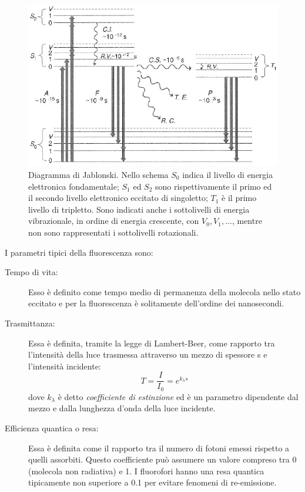 \begin{figure}
 \centering
 \includegraphics[scale=.45]{img/CAP1jablonski.JPG}
 \caption{\small{Diagramma di Jablonski. Nello schema $S_0$ indica il livello di energia elettronica fondamentale; $S_1$ ed $S_2$ sono rispettivamente il primo ed il secondo livello elettronico eccitato di singoletto; $T_1$ è il primo livello di tripletto. Sono indicati anche i sottolivelli di energia vibrazionale, in ordine di energia crescente, con $V_0, V_1, ...$, mentre non sono rappresentati i sottolivelli rotazionali.}}
 \label{fig:jablonski}
\end{figure}

I parametri tipici della fluorescenza sono:
\begin{description}
\item [Tempo di vita:]
Esso è definito come tempo medio di permanenza della molecola nello stato eccitato e per la fluorescenza è solitamente dell'ordine dei nanosecondi.
\item [Trasmittanza:]
Essa è definita, tramite la legge di Lambert-Beer, come rapporto tra l'intensità della luce trasmessa attraverso un mezzo di spessore s e l'intensità incidente: $$ T=\frac{I}{I_0} = e^ {k_\lambda s}$$ dove $k_\lambda$ è detto \textit{coefficiente di estinzione} ed è un parametro dipendente dal mezzo e dalla lunghezza d'onda della luce incidente.
\item [Efficienza quantica o resa:] 
Essa è definita come il rapporto tra il numero di fotoni emessi rispetto a quelli assorbiti. 
Questo coefficiente può assumere un valore compreso tra 0 (molecola non radiativa) e 1. I fluorofori hanno una resa quantica tipicamente non superiore a 0.1 per evitare fenomeni di re-emissione\cite{quantumyield}.
\end{description}


